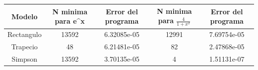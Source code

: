 \documentclass{article}
\begin{document}
\begin{tabular}{|c|c|c|c|c|}
\hline
Modelo & N minima para e^x & Error del programa & N minima para $\frac{4}{1+x^2}$ & Error del programa \\
\hline
Rectangulo & 13592 & 6.32085e-05 & 12991 & 7.69754e-05 \\ 
\hline
Trapecio & 48 & 6.21481e-05 & 82 & 2.47868e-05 \\ 
\hline
Simpson & 13592 & 3.70135e-05 & 4 & 1.51131e-07 \\ 
\hline
\end{tabular}
\end{document}
